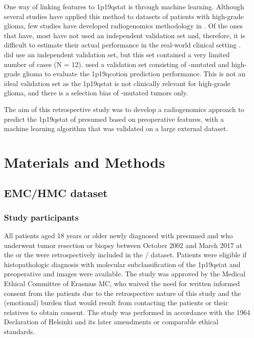 One way of linking  features to \acl{1p19qstat} is through machine learning.
Although several studies have applied this method to datasets of patients with high-grade glioma, few studies have developed radiogenomics methodology in  \autocite{akkus2017predicting, li2017deep, chang2018deep, han2018non, lu2018machine, zhou2019machine}.
Of the ones that have, most have not used an independent validation set and, therefore, it is difficult to estimate their actual performance in the real-world clinical setting \autocite{akkus2017predicting, li2017deep, chang2018deep, han2018non}.
 did use an independent validation set, but this set contained a very limited number of  cases (N = 12).
 used a validation set consisting of -mutated  and high-grade glioma to evaluate the \acl{1p19qcotion} prediction performance.
This is not an ideal validation set as the \acl{1p19qstat} is not clinically relevant for high-grade glioma, and there is a selection bias of -mutated \glspl{tumor} only.

The aim of this retrospective study was to develop a radiogenomics approach to predict the \acl{1p19qstat} of presumed  based on preoperative  features, with a machine learning algorithm that was validated on a large external dataset.

\section{Materials and Methods}
\subsection{\acrshort{EMC}/\acrshort{HMC} dataset}
\subsubsection{Study participants}

All patients aged 18 years or older newly diagnosed with presumed  and who underwent \gls{tumor} resection or biopsy between October 2002 and March 2017 at the  or the  were retrospectively included in the / dataset.
Patients were eligible if histopathologic diagnosis with molecular subclassification of the \acl{1p19qstat} and preoperative  and   images were available.
The study was approved by the Medical Ethical Committee of Erasmus MC, who waived the need for written informed consent from the patients due to the retrospective nature of this study and the (emotional) burden that would result from contacting the patients or their relatives to obtain consent.
The study was performed in accordance with the 1964 Declaration of Helsinki and its later amendments or comparable ethical standards.

